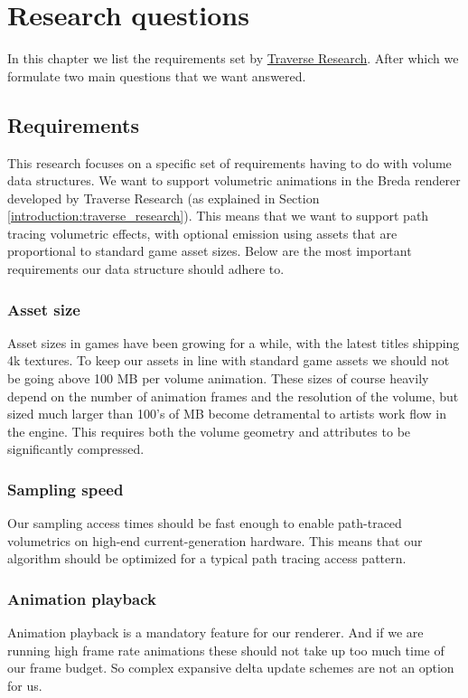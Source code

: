 \section{Research questions}\label{research_questions}
In this chapter we list the requirements set by \href{https://traverseresearch.nl/}{Traverse Research}. After which we formulate two main questions that we want answered.

\subsection{Requirements} \label{requirements}
This research focuses on a specific set of requirements having to do with volume data structures. We want to support volumetric animations in the Breda renderer developed by Traverse Research (as explained in Section \ref{introduction:traverse_research}). This means that we want to support path tracing volumetric effects, with optional emission using assets that are proportional to standard game asset sizes. Below are the most important requirements our data structure should adhere to.
\subsubsection{Asset size} \label{requirements:asset_size}
Asset sizes in games have been growing for a while, with the latest titles shipping 4k textures. To keep our assets in line with standard game assets we should not be going above 100 MB per volume animation. These sizes of course heavily depend on the number of animation frames and the resolution of the volume, but sized much larger than 100's of MB become detramental to artists work flow in the engine. This requires both the volume geometry and attributes to be significantly compressed.
\subsubsection{Sampling speed} \label{requirements:sampling_speed}
Our sampling access times should be fast enough to enable path-traced volumetrics on high-end current-generation hardware. This means that our algorithm should be optimized for a typical path tracing access pattern.
\subsubsection{Animation playback} \label{requirements:animation_playback}
Animation playback is a mandatory feature for our renderer. And if we are running high frame rate animations these should not take up too much time of our frame budget. So complex expansive delta update schemes are not an option for us.
